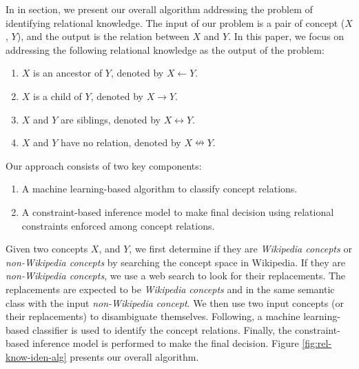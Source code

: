 In in section, we present our overall algorithm addressing the problem of
identifying relational knowledge. The input of our problem is a pair
of concept ($X$, $Y$), and the output is the relation
between $X$ and $Y$. In this paper, we focus on addressing the
following relational knowledge as the output of the problem:

\begin{enumerate}
\item $X$ is an ancestor of $Y$, denoted by $X \leftarrow Y$.
\item $X$ is a child of $Y$, denoted by $X \rightarrow Y$.
\item $X$ and $Y$ are siblings, denoted by $X \leftrightarrow Y$.
\item $X$ and $Y$ have no relation, denoted by $X \nleftrightarrow Y$.
\end{enumerate}

Our approach consists of two key components:

\begin{enumerate}
\item A machine learning-based algorithm to classify concept relations.
\item A constraint-based inference model to make final decision using
  relational constraints enforced among concept relations.
\end{enumerate}

Given two concepts $X$, and $Y$, we first determine if they are {\em
  Wikipedia concepts} or {\em non-Wikipedia concepts} by searching the
concept space in Wikipedia. If they are {\em non-Wikipedia concepts},
we use a web search to look for their replacements. The
replacements are expected to be {\em Wikipedia concepts} and in the
same semantic class with the input {\em non-Wikipedia concept}. We
then use two input concepts (or their replacements) to disambiguate
themselves. Following, a machine learning-based classifier is used to
identify the concept relations. Finally, the constraint-based
inference model is performed to make the final decision. Figure
\ref{fig:rel-know-iden-alg} presents our overall algorithm.

